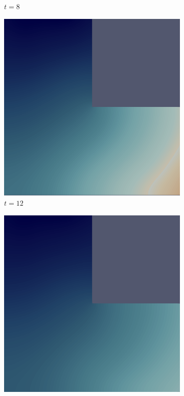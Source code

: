 \begin{figure}[H]
\begin{subfigure}{.4\textwidth}
        \caption{$t = 8$}
    \end{subfigure}
    \begin{subfigure}{.4\textwidth}
        \includegraphics[width=\textwidth]{imgs/LShapeSource_Solution/third.png}
        \caption{$t = 12$}
    \end{subfigure}
    \begin{subfigure}{.4\textwidth}
        \includegraphics[width=\textwidth]{imgs/LShapeSource_Solution/fourth.png}

\end{subfigure}
\end{figure}
